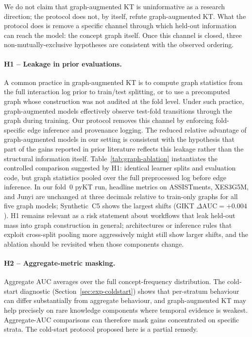 \documentclass[runningheads]{llncs}
\newcommand{\KCs}{knowledge components}
\begin{document}
We do not claim that graph-augmented KT is uninformative as a research
direction; the protocol does not, by itself, refute graph-augmented KT.
What the protocol does is remove a specific channel through which
held-out information can reach the model: the concept graph itself.
Once this channel is closed, three non-mutually-exclusive hypotheses
are consistent with the observed ordering.

\paragraph{H1 -- Leakage in prior evaluations.}
A common practice in graph-augmented KT is to compute graph statistics
from the full interaction log prior to train/test splitting, or to use
a precomputed graph whose construction was not audited at the fold
level. Under such practice, graph-augmented models effectively observe
test-fold transitions through the graph during training. Our protocol
removes this channel by enforcing fold-specific edge inference and
provenance logging. The reduced relative advantage of graph-augmented
models in our setting is consistent with the hypothesis that part of
the gains reported in prior literature reflects this leakage rather
than the structural information itself.
Table~\ref{tab:graph-ablation} instantiates the controlled comparison suggested by H1:
identical learner splits and evaluation code, but graph statistics pooled over the full
preprocessed log before edge inference.
In our fold~0 pyKT run, headline metrics on ASSISTments, XES3G5M, and Junyi are
unchanged at three decimals relative to train-only graphs for all five graph models;
Synthetic~C5 shows the largest shifts (GIKT $\Delta\text{AUC}{=}{+}0.004$).
H1 remains relevant as a risk statement about workflows that leak held-out mass into
graph construction in general; architectures or inference rules that exploit
cross-split pooling more aggressively might still show larger shifts, and the ablation
should be revisited when those components change.

\paragraph{H2 -- Aggregate-metric masking.}
Aggregate AUC averages over the full concept-frequency distribution.
The cold-start diagnostic (Section~\ref{sec:exp-coldstart}) shows that
per-stratum behaviour can differ substantially from aggregate
behaviour, and graph-augmented KT may help precisely on rare \KCs{}
where temporal evidence is weakest. Aggregate-AUC comparisons can
therefore mask gains concentrated on specific strata. The cold-start
protocol proposed here is a partial remedy.
\end{document}

